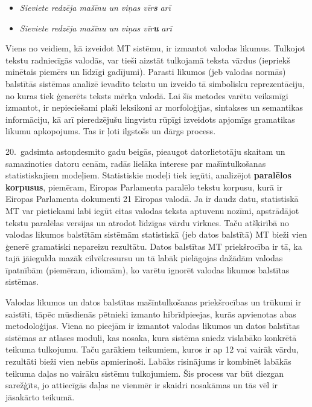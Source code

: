 \begin{multicols}{2}
\begin{itemize}
\item \textit{Sieviete redzēja mašīnu un viņas vīr}\textbf{\textit{s}}\textit{ arī}
\item \textit{Sieviete redzēja mašīnu un viņas vīr}\textbf{\textit{u}}\textit{ arī}
\end{itemize}

Viens no veidiem, kā izveidot MT sistēmu, ir izmantot valodas likumus. 
Tulkojot tekstu radniecīgās valodās, var tieši aizstāt tulkojamā teksta vārdus (iepriekš minētais piemērs un līdzīgi gadījumi). 
Parasti likumos (jeb valodas normās) balstītās sistēmas analizē ievadīto tekstu un izveido tā simbolisku reprezentāciju, no kuras tiek ģenerēts teksts mērķa valodā. 
Lai šīs metodes varētu veiksmīgi izmantot, ir nepieciešami plaši leksikoni ar morfoloģijas, sintakses un semantikas informāciju, kā arī pieredzējušu lingvistu rūpīgi izveidots apjomīgs gramatikas likumu apkopojums. 
Tas ir ļoti ilgstošs un dārgs process.

20.~gadsimta astoņdesmito gadu beigās, pieaugot datorlietotāju skaitam un samazinoties datoru cenām, radās lielāka interese par mašīntulkošanas statistiskajiem modeļiem. 
Statistiskie modeļi tiek iegūti, analizējot \textbf{paralēlos korpusus}, piemēram, Eiropas Parlamenta paralēlo tekstu korpusu, kurā ir Eiropas Parlamenta dokumenti 21 Eiropas valodā. 
Ja ir daudz datu, statistiskā MT var pietiekami labi iegūt citas valodas teksta aptuvenu nozīmi, apstrādājot tekstu paralēlas versijas un atrodot līdzīgas vārdu virknes. 
Taču atšķirībā no valodas likumos balstītām sistēmām statistiskā (jeb datos balstītā) MT bieži vien ģenerē gramatiski nepareizu rezultātu. 
Datos balstītas MT priekšrocība ir tā, ka tajā jāiegulda mazāk cilvēkresursu un tā labāk pielāgojas dažādām valodas īpatnībām (piemēram, idiomām), ko varētu ignorēt valodas likumos balstītas sistēmas. 


Valodas likumos un datos balstītas mašīntulkošanas priekšrocības un trūkumi ir saistīti, tāpēc mūsdienās pētnieki izmanto hibrīdpieejas, kurās apvienotas abas metodoloģijas. 
Viena no pieejām ir izmantot valodas likumos un datos balstītas sistēmas ar atlases moduli, kas nosaka, kura sistēma sniedz vislabāko konkrētā teikuma tulkojumu. 
Taču garākiem teikumiem, kuros ir ap 12 vai vairāk vārdu, rezultāti bieži vien nebūs apmierinoši. 
Labāks risinājums ir kombinēt labākās teikuma daļas no vairāku sistēmu tulkojumiem. 
Šis process var būt diezgan sarežģīts, jo attiecīgās daļas ne vienmēr ir skaidri nosakāmas un tās vēl ir jāsakārto teikumā. 


\end{multicols}
